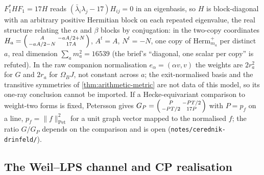 \begin{proposition}
\label{prop:lps-metric-cone}
$F_1^{*}HF_1 = 17H$ reads $(\bar\lambda_i\lambda_j-17)H_{ij} = 0$ in an eigenbasis, so $H$ is block-diagonal with an arbitrary positive
Hermitian block on each repeated eigenvalue, the real structure relating the $\alpha$ and $\beta$ blocks by conjugation: in the
two-copy coordinates $H_a = \begin{psmallmatrix}A&-aA/2+N\\-aA/2-N&17A\end{psmallmatrix}$, $A^{t} = A$, $N^{t} = -N$, one copy of
$\mathrm{Herm}^+_{m_a}$ per distinct $a$, real dimension $\sum_a m_a^2 = 16539$ (the brief's ``diagonal, one scalar per copy'' is
refuted). In the raw companion normalisation $e_\alpha = (\alpha v,v)$ the weights are $2r_a^2$ for $G$ and $2r_a$ for $\Omega_BJ$, not %
constant across $a$; the exit-normalised basis and the transitive symmetries of \cref{thm:arithmetic-metric} are not data of
this model, so its one-ray conclusion cannot be imported. If a Hecke-equivariant comparison to weight-two forms is fixed,
Petersson gives $G_P = \begin{psmallmatrix}P&-PT/2\\-PT/2&17P\end{psmallmatrix}$ with $P = p_f$ on a line, $p_f = \|f\|^2_{\mathrm{Pet}}$
for a unit graph vector mapped to the normalised $f$; the ratio $G/G_P$ depends on the comparison and is open
(\texttt{notes/cerednik-drinfeld/}).
\end{proposition}

\subsection{The Weil--LPS channel and CP realisation}

